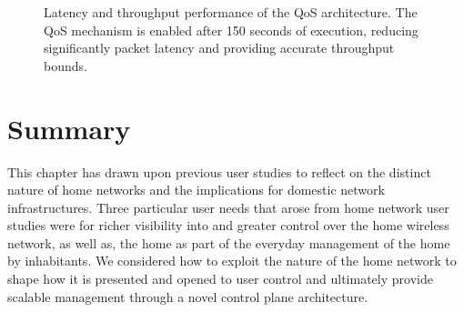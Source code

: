 \begin{figure} \centering
 \caption[QoS mechanism Latency and throughput evaluation]{\label{f:homework:performance-qos} Latency and throughput performance
  of the QoS architecture. The QoS mechanism is enabled after 150 seconds of
  execution, reducing significantly packet latency and providing accurate
  throughput bounds.}
\end{figure}

\section{Summary} \label{s:conclusion}

This chapter has drawn upon previous user studies to reflect on the distinct
nature of home networks and the implications for domestic network
infrastructures.  Three particular user needs that arose from home network user
studies were for richer visibility into and greater control over the home
wireless network, as well as, the home as part of the everyday management of the
home by inhabitants.  We  considered how to exploit the nature of the home
network to shape how it is presented and opened to user control and ultimately
provide scalable management through a novel control plane architecture.  

